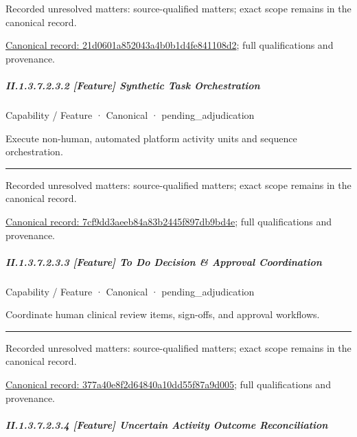{\small Recorded unresolved matters: source-qualified matters; exact scope remains in the canonical record.}\par
{\footnotesize \href{../../../../../../../continuum/strategy/capability/feature/21d0601a852043a4b0b1d4fe841108d2.md}{Canonical record: 21d0601a852043a4b0b1d4fe841108d2}; full qualifications and provenance.}\par
\subparagraph*{II.1.3.7.2.3.2 [Feature] Synthetic Task Orchestration}
\label{navigation:II.1.3.7.2.3.2}

\label{element:7cf9dd3aeeb84a83b2445f897db9bd4e}
{\small Capability / Feature · Canonical · pending\_adjudication}\par

Execute non-human, automated platform activity units and sequence orchestration.



\medskip\hrule\medskip

{\small Recorded unresolved matters: source-qualified matters; exact scope remains in the canonical record.}\par
{\footnotesize \href{../../../../../../../continuum/strategy/capability/feature/7cf9dd3aeeb84a83b2445f897db9bd4e.md}{Canonical record: 7cf9dd3aeeb84a83b2445f897db9bd4e}; full qualifications and provenance.}\par
\subparagraph*{II.1.3.7.2.3.3 [Feature] To Do Decision \& Approval Coordination}
\label{navigation:II.1.3.7.2.3.3}

\label{element:377a40e8f2d64840a10dd55f87a9d005}
{\small Capability / Feature · Canonical · pending\_adjudication}\par

Coordinate human clinical review items, sign-offs, and approval workflows.



\medskip\hrule\medskip

{\small Recorded unresolved matters: source-qualified matters; exact scope remains in the canonical record.}\par
{\footnotesize \href{../../../../../../../continuum/strategy/capability/feature/377a40e8f2d64840a10dd55f87a9d005.md}{Canonical record: 377a40e8f2d64840a10dd55f87a9d005}; full qualifications and provenance.}\par
\subparagraph*{II.1.3.7.2.3.4 [Feature] Uncertain Activity Outcome Reconciliation}
\label{navigation:II.1.3.7.2.3.4}

